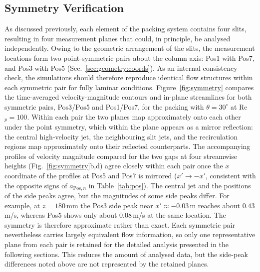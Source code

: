 \subsection{Symmetry Verification}
\label{sec:numerics:symmetry}
As discussed previously, each element of the packing system contains four slits, resulting in four measurement planes that could, in principle, be analysed independently. Owing to the geometric arrangement of the slits, the measurement locations form two point-symmetric pairs about the column axis: Pos1 with Pos7, and Pos3 with Pos5 (Sec.~\ref{sec:geometry:coords}). As an internal consistency check, the simulations should therefore reproduce identical flow structures within each symmetric pair for fully laminar conditions.
Figure~\ref{fig:symmetry} compares the time-averaged velocity-magnitude contours and in-plane streamlines for both symmetric pairs, Pos3/Pos5 and Pos1/Pos7, for the packing with $\theta=30^\circ$ at Re$_p=100$. Within each pair the two planes map approximately onto each other under the point symmetry, which within the plane appears as a mirror reflection: the central high-velocity jet, the neighbouring slit jets, and the recirculation regions map approximately onto their reflected counterparts. The accompanying profiles of velocity magnitude compared for the two gaps at four streamwise heights (Fig.~\ref{fig:symmetry}b,d) agree closely within each pair once the $x$ coordinate of the profiles at Pos5 and Pos7 is mirrored ($x'\to-x'$, consistent with the opposite signs of $a_{\mathrm{Pos},n}$ in Table~\ref{tab:pos}). The central jet and the positions of the side peaks agree, but the magnitudes of some side peaks differ. For example, at $z=180$\,mm the Pos3 side peak near $x'\approx-0.03$\,m reaches about $0.43$\,m/s, whereas Pos5 shows only about $0.08$\,m/s at the same location. The symmetry is therefore approximate rather than exact. Each symmetric pair nevertheless carries largely equivalent flow information, so only one representative plane from each pair is retained for the detailed analysis presented in the following sections. This reduces the amount of analysed data, but the side-peak differences noted above are not represented by the retained planes.
